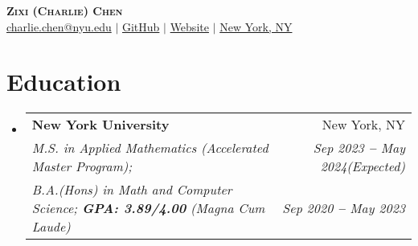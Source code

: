 \documentclass[letterpaper,11pt]{article}
\makeatletter
\newcommand{\resumeItem}[1]{
  \item\small{
    {#1 \vspace{-2pt}}
  }
}
\newcommand{\resumeEducationHeading}[6]{
  \vspace{-2pt}\item
    \begin{tabular*}{0.97\textwidth}[t]{l@{\extracolsep{\fill}}r}
      \textbf{#1} & #2 \\
      \textit{\small#3} & \textit{\small #4} \\
      \textit{\small#5} & \textit{\small #6} \\
    \end{tabular*}\vspace{-5pt}
}
\newcommand{\resumeSubHeadingListStart}{\begin{itemize}[leftmargin=0.15in, label={}]}
\newcommand{\resumeSubHeadingListEnd}{\end{itemize}}
\newcommand{\resumeItemListStart}{\begin{itemize}}
\newcommand{\resumeItemListEnd}{\end{itemize}\vspace{-5pt}}
\makeatother
\begin{document}

\begin{center}
    \textbf{\Huge \scshape Zixi (Charlie) Chen} \\ \vspace{3pt}
    \small
    \faAt \hspace{.5pt} \href{mailto:charlie.chen@nyu.edu}{charlie.chen@nyu.edu}
    $|$
    \faGithub \hspace{.5pt} \href{https://github.com/charliezchen/}{GitHub}
    $|$
    \faGlobe \hspace{.5pt} \href{https://charliezchen.github.io/}{Website}
    $|$
    \faMapMarker \hspace{.5pt} \href{https://goo.gl/maps/8Rqa9jmpkqiD6akv5}{New York, NY}
\end{center}




\section{Education}
  \vspace{3pt}
  \resumeSubHeadingListStart
    
    \resumeEducationHeading
      {New York University}{New York, NY}
      {M.S. in Applied Mathematics (Accelerated Master Program);}{Sep 2023 \textbf{--} May 2024(Expected)}
      {B.A.(Hons) in Math and Computer Science;   \textbf{GPA: 3.89/4.00} (Magna Cum Laude)}{Sep 2020 \textbf{--} May 2023}
    
  \resumeSubHeadingListEnd


\end{document}
